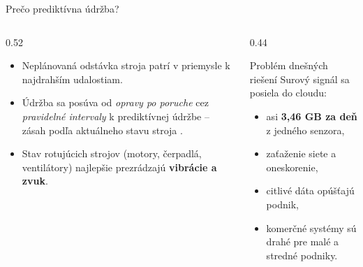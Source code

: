 \documentclass[aspectratio=169,11pt]{beamer}
\begin{document}
\begin{frame}{Prečo prediktívna údržba?}
  \begin{columns}[T]
    \begin{column}{0.52\textwidth}
      \begin{itemize}
        \item Neplánovaná odstávka stroja patrí v priemysle k najdrahším udalostiam.
        \item Údržba sa posúva od \emph{opravy po poruche} cez \emph{pravidelné intervaly} k \alert{prediktívnej údržbe} -- zásah podľa aktuálneho stavu stroja \cite{njor}.
        \item Stav rotujúcich strojov (motory, čerpadlá, ventilátory) najlepšie prezrádzajú \textbf{vibrácie a zvuk}.
      \end{itemize}
    \end{column}
    \begin{column}{0.44\textwidth}
      \begin{alertblock}{Problém dnešných riešení}
        Surový signál sa posiela do cloudu:
        \begin{itemize}
          \item asi \textbf{3,46 GB za deň} z jedného senzora,
          \item zaťaženie siete a oneskorenie,
          \item citlivé dáta opúšťajú podnik,
          \item komerčné systémy sú drahé pre malé a stredné podniky.
        \end{itemize}
      \end{alertblock}
    \end{column}
  \end{columns}
\end{frame}
\end{document}
